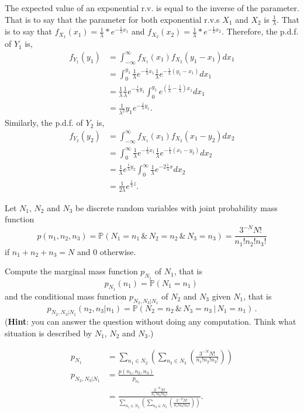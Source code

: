 \documentclass[letterpaper,12pt,addpoints]{exam}
\renewcommand{\Pr}{\mathbb{P}}
\begin{document}
\begin{questions}
The expected value of an exponential r.v. is equal to the inverse of the parameter. That is to say that the parameter for both exponential r.v.s $X_1$ and $X_2$ is $\frac{1}{\lambda}$. That is to say that $f_{X_1}(x_1)=\frac{1}{\lambda}*e^{-\frac{1}{\lambda}x_1}$ and $f_{X_2}(x_2)=\frac{1}{\lambda}*e^{-\frac{1}{\lambda}x_2}$. Therefore, the p.d.f. of $Y_1$ is,
\begin{align*}
    f_{Y_1}(y_1) &= \int_{-\infty}^{\infty}f_{X_1}(x_1)f_{X_2}(y_1-x_1)dx_1\\
    &= \int_0^{y_1}\frac{1}{\lambda}e^{-\frac{1}{\lambda}x_1}\frac{1}{\lambda}e^{-\frac{1}{\lambda}(y_1-x_1)}dx_1\\
    &= \frac{1}{\lambda}\frac{1}{\lambda}e^{-\frac{1}{\lambda}y_1}\int_0^{y_1}e^{(\frac{1}{\lambda}-\frac{1}{\lambda})x_1}dx_1\\
    &= \frac{1}{\lambda^2}y_1e^{-\frac{1}{\lambda}y_1}.
\end{align*} Similarly, the p.d.f. of $Y_2$ is,
\begin{align*}
    f_{Y_2}(y_2) &= \int_{-\infty}^{\infty}f_{X_1}(x_1)f_{X_2}(x_1-y_2)dx_2\\
    &= \int_0^{\infty}\frac{1}{\lambda}e^{-\frac{1}{\lambda}x_1}\frac{1}{\lambda}e^{-\frac{1}{\lambda}(x_1-y_2)}dx_2\\
    &= \frac{1}{\lambda}e^{\frac{1}{\lambda}y_2}\int_0^{\infty}\frac{1}{\lambda}e^{-2\frac{1}{\lambda}x}dx_2\\
    &= \frac{1}{2\lambda}e^{\frac{1}{\lambda}z}.
\end{align*}

\vspace*{\fill}\eject

\bonusquestion[15] Let $N_1$, $N_2$ and $N_3$ be discrete random 
variables with joint probability mass function
\[
 p(n_1,n_2,n_3)=\Pr(N_1=n_1\,\&\, N_2=n_2\,\&\, 
N_3=n_3)=\frac{3^{-N}N!}{n_1!n_2!n_3!}
\]
if $n_1+n_2+n_3=N$ and 0 otherwise.

Compute the marginal mass function $p_{N_1}$ of $N_1$, 
that is
\[
 p_{N_1}(n_1)=\Pr(N_1=n_1)\, 
\]
and the conditional mass function $p_{N_2,N_3 | N_1}$ of $N_2$ and 
$N_3$ given $N_1$, that is
\[
 p_{N_2,N_3 | N_1}(n_2,n_3 | n_1)=\Pr(N_2=n_2\,\&\, N_3=n_3\, |\, N_1=n_1)\,.
\]
({\bf Hint}: you can answer the question without doing any computation. Think 
what situation is described by $N_1$, $N_2$ and $N_3$.)

\begin{align*}
    p_{N_1} &= \sum_{n_1\in N_2}(\sum_{n_3\in N_3}(\frac{3^{-N}N!}{n_1!n_2!n_3!}))\\
    p_{N_2,N_3|N_1} &= \frac{p(n_1,n_2,n_3)}{p_{n_1}}\\
    &= \frac{\frac{3^{-N}N!}{n_1!n_2!n_3!}}{\sum_{n_1\in N_2}(\sum_{n_3\in N_3}(\frac{3^{-N}N!}{n_1!n_2!n_3!}))}.
\end{align*}


\end{questions}
\end{document}
